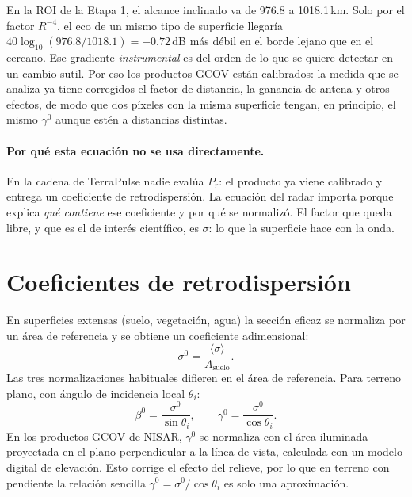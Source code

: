 \documentclass[11pt,a4paper]{article}
\begin{document}
\begin{ejemplo}
En la ROI de la Etapa 1, el alcance inclinado va de 976.8 a 1018.1\,km. Solo por el factor $R^{-4}$, el eco
de un mismo tipo de superficie llegaría $40\log_{10}(976.8/1018.1)=-0.72$\,dB más débil en el borde lejano
que en el cercano. Ese gradiente \emph{instrumental} es del orden de lo que se quiere detectar en un cambio
sutil. Por eso los productos GCOV están calibrados: la medida que se analiza ya tiene corregidos el factor
de distancia, la ganancia de antena y otros efectos, de modo que dos píxeles con la misma superficie
tengan, en principio, el mismo $\gamma^0$ aunque estén a distancias distintas.
\end{ejemplo}

\paragraph{Por qué esta ecuación no se usa directamente.} En la cadena de TerraPulse nadie evalúa $P_r$: el
producto ya viene calibrado y entrega un coeficiente de retrodispersión. La ecuación del radar importa
porque explica \emph{qué contiene} ese coeficiente y por qué se normalizó. El factor que queda libre, y que
es el de interés científico, es $\sigma$: lo que la superficie hace con la onda.

\section{Coeficientes de retrodispersión}
\label{sec:retro}

En superficies extensas (suelo, vegetación, agua) la sección eficaz se normaliza por un área de
referencia y se obtiene un coeficiente adimensional:
\begin{equation}
  \sigma^0 = \frac{\langle \sigma \rangle}{A_{\text{suelo}}} .
\end{equation}
Las tres normalizaciones habituales difieren en el área de referencia. Para terreno plano, con
ángulo de incidencia local $\theta_i$:
\begin{equation}
  \beta^0 = \frac{\sigma^0}{\sin\theta_i},
  \qquad
  \gamma^0 = \frac{\sigma^0}{\cos\theta_i}.
\end{equation}
En los productos GCOV de NISAR, $\gamma^0$ se normaliza con el área iluminada proyectada en el
plano perpendicular a la línea de vista, calculada con un modelo digital de elevación. Esto
corrige el efecto del relieve, por lo que en terreno con pendiente la relación sencilla
$\gamma^0 = \sigma^0/\cos\theta_i$ es solo una aproximación.
\end{document}

